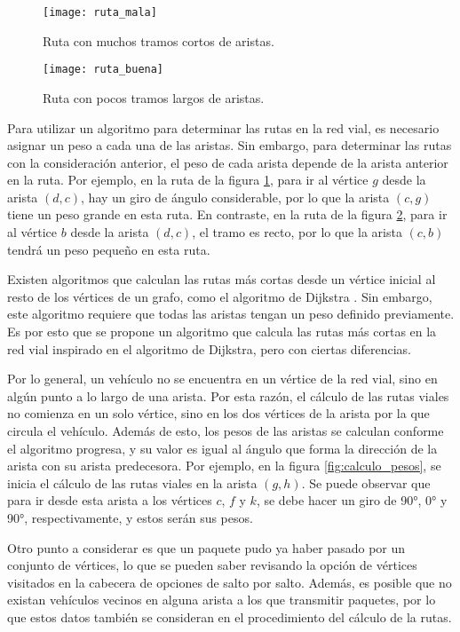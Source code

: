 \begin{figure}[th!]
\centering
\texttt{[image: ruta\_mala]}
\decoRule
\caption[Ruta con muchos tramos cortos de aristas]{Ruta con muchos tramos
cortos de aristas.}
\label{fig:ruta_mala}
\end{figure}

\begin{figure}[th!]
\centering
\texttt{[image: ruta\_buena]}
\decoRule
\caption[Ruta con pocos tramos largos de aristas]{Ruta con pocos tramos largos
de aristas.}
\label{fig:ruta_buena}
\end{figure}

Para utilizar un algoritmo para determinar las rutas en la red vial, es
necesario asignar un peso a cada una de las aristas. Sin embargo, para
determinar las rutas con la consideración anterior, el peso de cada arista
depende de la arista anterior en la ruta. Por ejemplo, en la ruta de la figura
\ref{fig:ruta_mala}, para ir al vértice $g$ desde la arista $(d,c)$, hay un
giro de ángulo considerable, por lo que la arista $(c,g)$ tiene un peso grande
en esta ruta. En contraste, en la ruta de la figura \ref{fig:ruta_buena}, para
ir al vértice $b$ desde la arista $(d,c)$, el tramo es recto, por lo que la
arista $(c,b)$ tendrá un peso pequeño en esta ruta.

Existen algoritmos que calculan las rutas más cortas desde un vértice inicial al
resto de los vértices de un grafo, como el algoritmo de Dijkstra
\cite{cormen2001}. Sin embargo, este algoritmo requiere que todas las aristas
tengan un peso definido previamente. Es por esto que se propone un algoritmo
que calcula las rutas más cortas en la red vial inspirado en el algoritmo de
Dijkstra, pero con ciertas diferencias.

Por lo general, un vehículo no se encuentra en un vértice de la red vial, sino
en algún punto a lo largo de una arista. Por esta razón, el cálculo de las
rutas viales no comienza en un solo vértice, sino en los dos vértices de la
arista por la que circula el vehículo. Además de esto, los pesos de las aristas
se calculan conforme el algoritmo progresa, y su valor es igual al ángulo que
forma la dirección de la arista con su arista predecesora. Por ejemplo, en la
figura \ref{fig:calculo_pesos}, se inicia el cálculo de las rutas viales en la
arista $(g,h)$. Se puede observar que para ir desde esta arista a los vértices
$c$, $f$ y $k$, se debe hacer un giro de 90\si{\degree}, 0\si{\degree} y
90\si{\degree}, respectivamente, y estos serán sus pesos.

Otro punto a considerar es que un paquete pudo ya haber pasado por un conjunto
de vértices, lo que se pueden saber revisando la opción de vértices visitados
en la cabecera de opciones de salto por salto. Además, es posible que no existan
vehículos vecinos en alguna arista a los que transmitir paquetes, por lo que
estos datos también se consideran en el procedimiento del cálculo de la rutas.

